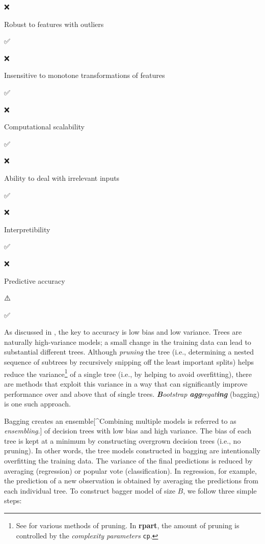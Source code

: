 \documentclass[]{book}
\let\rmarkdownfootnote\footnote%
\def\footnote{\protect\rmarkdownfootnote}
\theoremstyle{definition}
\theoremstyle{definition}
\theoremstyle{definition}
\theoremstyle{remark}
\begin{document}
❌

Robust to features with outliers

✅

❌

Insensitive to monotone transformations of features

✅

❌

Computational scalability

✅

❌

Ability to deal with irrelevant inputs

✅

❌

Interpretibility

✅

❌

Predictive accuracy

⚠️

✅

As discussed in \citet{friedman2001elements}, the key to accuracy is low
bias and low variance. Trees are naturally high-variance models; a small
change in the training data can lead to substantial different trees.
Although \emph{pruning} the tree (i.e., determining a nested sequence of
subtrees by recursively snipping off the least important splits) helps
reduce the variance\footnote{See \citet{esposito1997comparative} for
  various methods of pruning. In \textbf{rpart}, the amount of pruning
  is controlled by the \emph{complexity parameters} \texttt{cp}.} of a
single tree (i.e., by helping to avoid overfitting), there are methods
that exploit this variance in a way that can significantly improve
performance over and above that of single trees.
\emph{\textbf{B}ootstrap \textbf{agg}regat\textbf{ing}} (bagging)
\citep{breiman1996bagging} is one such approach.

Bagging creates an ensemble{[}\^{}Combining multiple models is referred
to as \emph{ensembling}.{]} of decision trees with low bias and high
variance. The bias of each tree is kept at a minimum by constructing
overgrown decision trees (i.e., no pruning). In other words, the tree
models constructed in bagging are intentionally overfitting the training
data. The variance of the final predictions is reduced by averaging
(regression) or popular vote (classification). In regression, for
example, the prediction of a new observation is obtained by averaging
the predictions from each individual tree. To construct bagger model of
size \(B\), we follow three simple steps:
\end{document}
